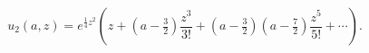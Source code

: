 \[u_{2}(a,z)=e^{\tfrac{1}{4}z^{2}}\left(z+(a-\tfrac{3}{2})\frac{z^{3}}{3!}+(a-%
\tfrac{3}{2})(a-\tfrac{7}{2})\frac{z^{5}}{5!}+\cdots\right).\]